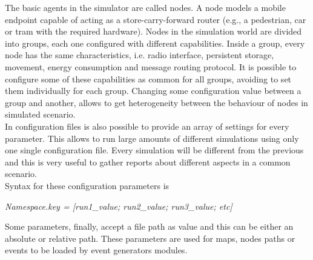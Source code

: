 The basic agents in the simulator are called nodes. A node models a mobile endpoint capable of acting as a store-carry-forward router (e.g., a pedestrian, car or tram with the required hardware). Nodes in the simulation world are divided into groups, each one configured with different capabilities. Inside a group, every node has the same characteristics, i.e. radio interface, persistent storage, movement, energy consumption and message routing protocol. It is possible to configure some of these capabilities as common for all groups, avoiding to set them individually for each group. Changing some configuration value between a group and another, allows to get heterogeneity between the behaviour of nodes in simulated scenario.
\\

In configuration files is also possible to provide an array of settings for every parameter. This allows to run large amounts of different simulations using only one single configuration file. Every simulation will be different from the previous and this is very useful to gather reports about different aspects in a common scenario.
\\ Syntax for these configuration parameters is

\begin{center}
\textit{Namespace.key = [run1\_value; run2\_value; run3\_value; etc]}
\end{center}

Some parameters, finally, accept a file path as value and this can be either an absolute or relative path. These parameters are used for maps, nodes paths or events to be loaded by event generators modules.

